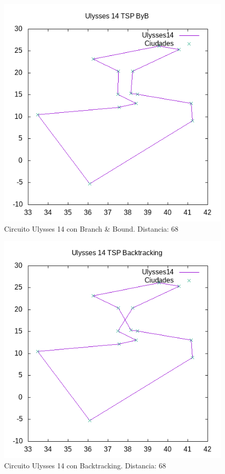 \documentclass{article}
\begin{document}
	\begin{figure}[H]
		\centering
		\includegraphics[totalheight=6cm]{ulysses14byb}
		\caption{Circuito Ulysses 14 con Branch \& Bound. Distancia: 68}
		\label{fig:u14byb}
	\end{figure}

	\begin{figure}[H]
		\centering
		\includegraphics[totalheight=6cm]{ulysses14back}
		\caption{Circuito Ulysses 14 con Backtracking. Distancia: 68}
		\label{fig:u14back}
	\end{figure}
\end{document}
